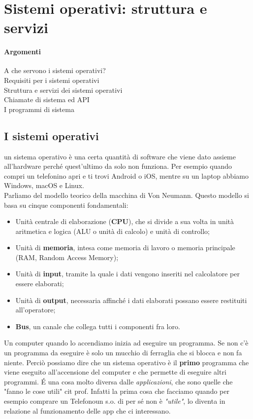 \chapter{Sistemi operativi: struttura e servizi}
\subsubsection{Argomenti}
A che servono i sistemi operativi?\\
Requisiti per i sistemi operativi\\
Struttura e servizi dei sistemi operativi\\
Chiamate di sistema ed API\\
I programmi di sistema

\section{I sistemi operativi}
un sistema operativo è una certa quantità di software che viene dato assieme all'hardware perché quest'ultimo da solo non funziona. Per esempio quando compri un telefonino apri e ti trovi Android o iOS, mentre su un laptop abbiamo Windows, macOS e Linux.\\ 
Parliamo del modello teorico della macchina di Von Neumann. Questo modello si basa su cinque componenti fondamentali:
\begin{itemize}
    \item Unità centrale di elaborazione (\textbf{CPU}), che si divide a sua volta in unità aritmetica e logica (ALU o unità di calcolo) e unità di controllo;
    \item Unità di \textbf{memoria}, intesa come memoria di lavoro o memoria principale (RAM, Random Access Memory);
    \item Unità di \textbf{input}, tramite la quale i dati vengono inseriti nel calcolatore per essere elaborati;
    \item Unità di \textbf{output}, necessaria affinché i dati elaborati possano essere restituiti all'operatore;
    \item \textbf{Bus}, un canale che collega tutti i componenti fra loro.
\end{itemize}
Un computer quando lo accendiamo inizia ad eseguire un programma. Se non c'è un programma da eseguire è solo un mucchio di ferraglia che si blocca e non fa niente. Perciò possiamo dire che un sistema operativo è il \textbf{primo} programma che viene eseguito all'accensione del computer e che permette di eseguire altri programmi. \'E una cosa molto diversa dalle \textit{applicazioni}, che sono quelle che "fanno le cose utili" cit prof. Infatti la prima cosa che facciamo quando per esempio comprare un Telefonoun s.o. di per sé non è \textit{"utile"}, lo diventa in relazione al funzionamento delle app che ci interessano.\\
